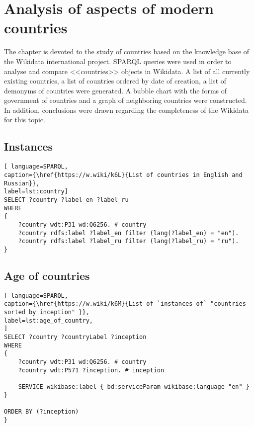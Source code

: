 \setchapterpreamble[u]{\margintoc}
\chapter{Analysis of aspects of modern countries\protect\footnotemark}


The chapter is devoted to the study of countries based on the knowledge base of the Wikidata international project. SPARQL queries were used in order to analyse and compare <<countries>> objects in Wikidata. A list of all currently existing countries, a list of countries ordered by date of creation, a list of demonyms of countries were generated. A bubble chart with the forms of government of countries and a graph of neighboring countries were constructed. In addition, conclusions were drawn regarding the completeness of the Wikidata for this topic.

\section{Instances}

\begin{lstlisting}[ language=SPARQL, 
caption={\href{https://w.wiki/k6L}{List of countries in English and Russian}},
label=lst:country]
SELECT ?country ?label_en ?label_ru
WHERE
{
	?country wdt:P31 wd:Q6256. # country
	?country rdfs:label ?label_en filter (lang(?label_en) = "en").
	?country rdfs:label ?label_ru filter (lang(?label_ru) = "ru").
}
\end{lstlisting}

\section{Age of countries}

\begin{lstlisting}[ language=SPARQL, 
caption={\href{https://w.wiki/k6M}{List of `instances of` "countries sorted by inception" }},
label=lst:age_of_country, 					
]
SELECT ?country ?countryLabel ?inception
WHERE
{
	?country wdt:P31 wd:Q6256. # country
	?country wdt:P571 ?inception. # inception
	
	SERVICE wikibase:label { bd:serviceParam wikibase:language "en" }
}

ORDER BY (?inception)
}
\end{lstlisting}

